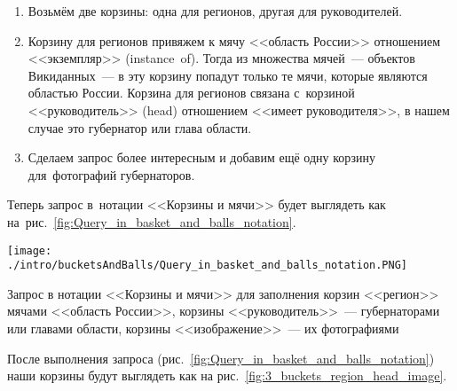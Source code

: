 \begin{enumerate}
    \item Возьмём две корзины: одна для регионов, другая для руководителей.
    \item Корзину для регионов привяжем к мячу <<область России>> отношением <<экземпляр>> (instance~of). 
        Тогда из множества мячей~--- объектов Викиданных~--- в эту корзину попадут только те мячи, которые являются областью России. 
        Корзина для регионов связана с~корзиной <<руководитель>> (head) отношением <<имеет руководителя>>, 
        в нашем случае это губернатор или глава области.
    \item 
          Сделаем запрос более интересным и добавим ещё одну корзину для~фотографий губернаторов. 
\end{enumerate}
Теперь запрос в~нотации <<Корзины и мячи>> будет выглядеть как на~рис.~\ref{fig:Query_in_basket_and_balls_notation}.

\begin{marginfigure}
    \texttt{[image: ./intro/bucketsAndBalls/Query\_in\_basket\_and\_balls\_notation.PNG]}
    \caption[Запрос в нотации <<Корзины и мячи>> для заполнения корзин мячами.]{Запрос в нотации <<Корзины и мячи>> для заполнения корзин <<регион>> мячами <<область России>>, корзины <<руководитель>>~--- губернаторами или главами области, корзины <<изображение>>~--- их фотографиями}
	\label{fig:Query_in_basket_and_balls_notation}
\end{marginfigure}




\newpage
После выполнения запроса (рис.~\ref{fig:Query_in_basket_and_balls_notation}) 
наши корзины будут выглядеть как на рис.~\ref{fig:3_buckets_region_head_image}.

\begin{marginfigure}%
{%
		\setlength{\fboxsep}{0pt}%
		\setlength{\fboxrule}{1pt}%
}
    \caption[Заполненные корзины после выполнении запроса.]{Заполненные корзины после выполнении запроса:\\ 
    \textit{?region}~--- области России, \textit{?head}~--- руководители,\\
    \textit{?image}~--- фотографии руководства}
	\label{fig:3_buckets_region_head_image}
\end{marginfigure}

